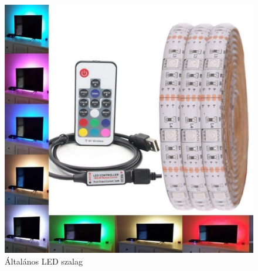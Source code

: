 \documentclass[../main.tex]{subfiles}
\begin{document}
            \begin{figure}[h!] 
                \centering
                    \includegraphics[height=6 cm]{irodalom_res/std_ledstrip}
                \caption{Általános LED szalag\cite{led_lighting12}}
                \label{fig:std_ledstrip}
             \end{figure}
        
\newpage
\end{document}
